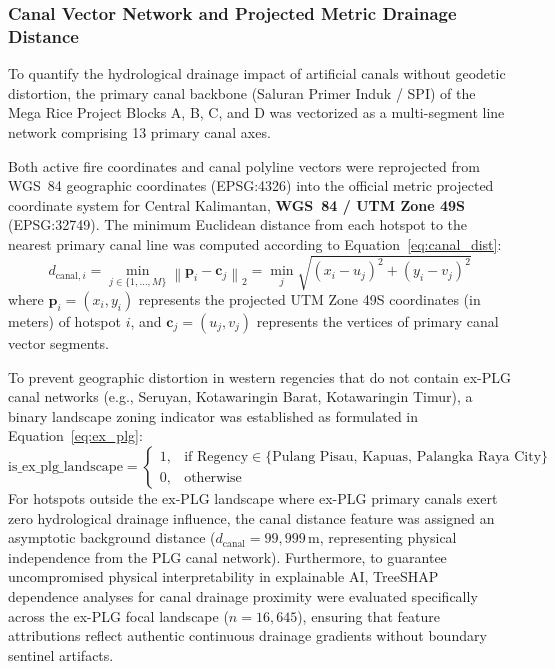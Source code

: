 \subsubsection{Canal Vector Network and Projected Metric Drainage Distance}
\label{subsubsec:canal_network}

To quantify the hydrological drainage impact of artificial canals without geodetic distortion, the primary canal backbone (Saluran Primer Induk / SPI) of the Mega Rice Project Blocks A, B, C, and D was vectorized as a multi-segment line network comprising 13 primary canal axes.

Both active fire coordinates and canal polyline vectors were reprojected from WGS~84 geographic coordinates (EPSG:4326) into the official metric projected coordinate system for Central Kalimantan, \textbf{WGS~84 / UTM Zone 49S} (\mbox{EPSG:32749}). The minimum Euclidean distance from each hotspot to the nearest primary canal line was computed according to Equation~\eqref{eq:canal_dist}:
\begin{equation}
d_{\text{canal}, i} = \min_{j \in \{1, \dots, M\}} \left\| \mathbf{p}_i - \mathbf{c}_j \right\|_2 = \min_{j} \sqrt{(x_i - u_j)^2 + (y_i - v_j)^2}
\label{eq:canal_dist}
\end{equation}
where $\mathbf{p}_i = (x_i, y_i)$ represents the projected UTM Zone 49S coordinates (in meters) of hotspot $i$, and $\mathbf{c}_j = (u_j, v_j)$ represents the vertices of primary canal vector segments.

To prevent geographic distortion in western regencies that do not contain ex-PLG canal networks (e.g., Seruyan, Kotawaringin Barat, Kotawaringin Timur), a binary landscape zoning indicator was established as formulated in Equation~\eqref{eq:ex_plg}:
\begin{equation}
\text{is\_ex\_plg\_landscape} = \begin{cases} 
1, & \text{if Regency} \in \{\text{Pulang Pisau, Kapuas, Palangka Raya City}\} \\ 
0, & \text{otherwise} 
\end{cases}
\label{eq:ex_plg}
\end{equation}
For hotspots outside the ex-PLG landscape where ex-PLG primary canals exert zero hydrological drainage influence, the canal distance feature was assigned an asymptotic background distance ($d_{\text{canal}} = 99,999$\,m, representing physical independence from the PLG canal network). Furthermore, to guarantee uncompromised physical interpretability in explainable AI, TreeSHAP dependence analyses for canal drainage proximity were evaluated specifically across the ex-PLG focal landscape ($n = 16,645$), ensuring that feature attributions reflect authentic continuous drainage gradients without boundary sentinel artifacts.


